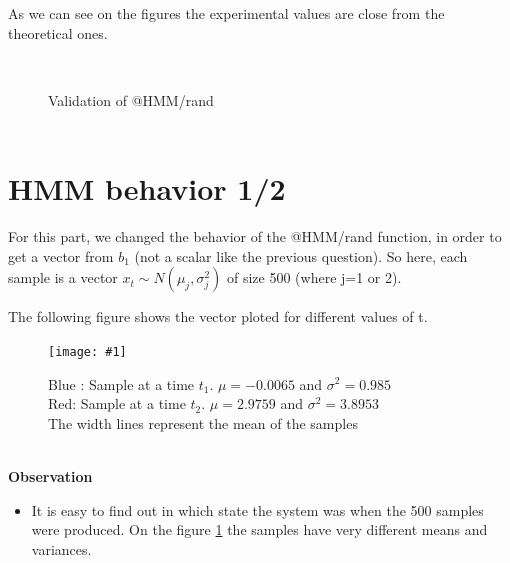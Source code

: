 \documentclass[a4paper]{report}
\newcommand{\img}[3]{\begin{figure}[!h] \centering \texttt{[image: \#1]}\captionsetup{justification=centering} \caption{#3} \label{#1} \end{figure}}
\newenvironment{pushright}[1]{\textbf{#1}
\begin{itemize}\item[\hspace{12pt}]}{\end{itemize}
}
\begin{document}
As we can see on the figures  the experimental values are close from the theoretical ones.
\begin{figure}[!h]
\centering
    \\
\captionsetup{justification=centering}
    \caption{Validation of @HMM/rand\\\color{blue}{Blue : Plot of the 20 attempts}\\\color{red}{Red : Mean over the 20 attempts}}
\end{figure}
\pagebreak
\section{HMM behavior 1/2}
For this part, we changed the behavior of the @HMM/rand function, in order to get a vector from $b_{1}$ (not a scalar like the previous question). So here, each sample is a vector $x_{t} \sim N(\mu_j,\sigma_j^2)$ of size 500 (where j=1 or 2).

The following figure shows the vector ploted for different values of t.
\img{etude_hmmrand}{0.4}{{\color{blue}Blue : Sample at a time $t_1$. $\mu=-0.0065$ and $\sigma^2=0.985$}\\ {\color{red}Red: Sample at a time $t_2$. $\mu=2.9759$ and $\sigma^2=3.8953$}\\ The width lines represent the mean of the samples}\\
\begin{pushright}{Observation}
  It is easy to find out in which state the system was when the 500 samples were produced. On the figure \ref{etude_hmmrand} the samples have very different means and variances.
\end{pushright}
\end{document}
